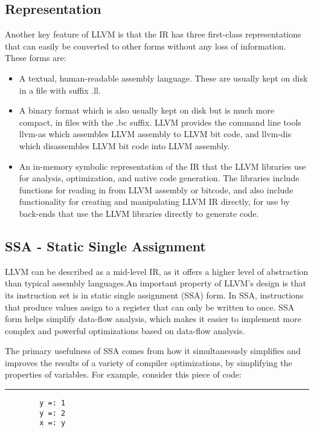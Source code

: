 \documentclass[openany]{book}
\begin{document}
	\subsection{Representation}
	Another key feature of LLVM is that the IR has three first-class representations that can easily be converted to other forms without any loss of information. These forms are:
	\begin{itemize}
		\item A textual, human-readable assembly language. These are usually kept on disk in a file with suffix .ll.
		\item A binary format which is also usually kept on disk but is much more compact, in files with the .bc suffix. LLVM provides the command line tools llvm-as	which assembles LLVM assembly to LLVM bit code, and llvm-dis which disassembles LLVM bit code into LLVM assembly.
		\item An in-memory symbolic representation of the IR that the LLVM libraries use for analysis, optimization, and native code generation. The libraries include functions for	reading in from LLVM assembly or bitcode, and also include functionality for creating and manipulating LLVM IR directly, for use by back-ends that use the LLVM	libraries directly to generate code.
	\end{itemize} 

	\subsection{SSA - Static Single Assignment}
	LLVM can be described as a mid-level IR, as it offers a higher level of abstraction than typical assembly languages.An important property of LLVM's design is that its instruction set is in static single assignment (SSA) form.  In SSA, instructions that produce values assign to a register that can only be written to once.  SSA form helps simplify data-flow analysis, which makes it easier to implement more complex and powerful optimizations based on data-flow analysis.
	
	The primary usefulness of SSA comes from how it simultaneously simplifies and improves the results of a variety of compiler optimizations, by simplifying the properties of variables. For example, consider this piece of code: \newline
	 
    \noindent\rule{12cm}{0.4pt}
	
	\begin{verbatim}
		y =: 1 
		y =: 2 
		x =: y
	\end{verbatim}
	
\end{document}
